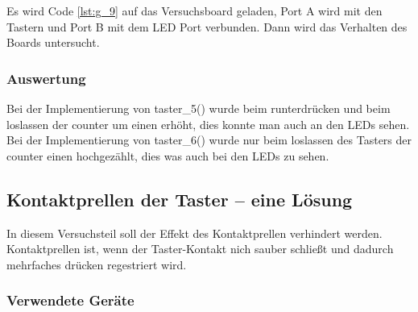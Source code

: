 \documentclass[12pt,a4paper]{article}
\begin{document}
Es wird Code \ref{lst:g_9} auf das Versuchsboard geladen, Port A wird mit den Tastern und Port B mit dem LED Port verbunden. Dann wird das Verhalten des Boards untersucht.

\subsubsection*{Auswertung}

Bei der Implementierung von taster\_5() wurde beim runterdrücken und beim loslassen der counter um einen erhöht, dies konnte man auch an den LEDs sehen.
Bei der Implementierung von taster\_6() wurde nur beim loslassen des Tasters der counter einen hochgezählt, dies was auch bei den LEDs zu sehen.

\subsection{Kontaktprellen der Taster -- eine Lösung}

In diesem Versuchsteil soll der Effekt des Kontaktprellen verhindert werden. Kontaktprellen ist, wenn der Taster-Kontakt nich sauber schließt und dadurch mehrfaches drücken regestriert wird.

\subsubsection*{Verwendete Geräte}
\end{document}
